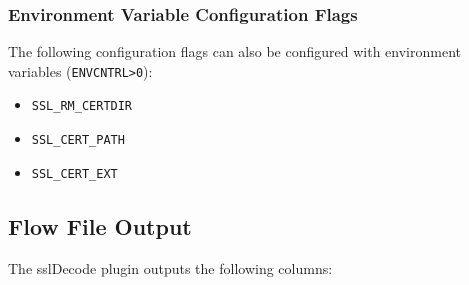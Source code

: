 \documentclass[documentation]{subfiles}
\begin{document}
\subsubsection{Environment Variable Configuration Flags}
The following configuration flags can also be configured with environment variables ({\tt ENVCNTRL>0}):
\begin{itemize}
    \item {\tt SSL\_RM\_CERTDIR}
    \item {\tt SSL\_CERT\_PATH}
    \item {\tt SSL\_CERT\_EXT}
\end{itemize}

\subsection{Flow File Output}
The sslDecode plugin outputs the following columns:
\end{document}
